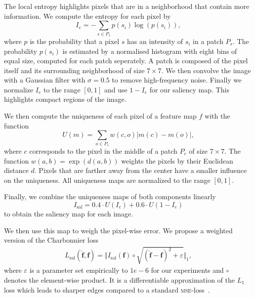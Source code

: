\documentclass{scrartcl}
\newcommand{\img}{\bm{f}} %
\begin{document}
The local entropy highlights pixels that are in a neighborhood that contain more information.
We compute the entropy for each pixel by
\begin{equation}
  \label{eq:entr}
  I_e = - \sum_{s \in P_s} p(s_i) \log(p(s_i)),
\end{equation}
where \(p\) is the probability that a pixel \(s\) has an intensity of \(s_i\) in a patch \(P_s\).
The probability $p(s_i)$ is estimated by a normalised histogram with eight bins of equal size, computed for each patch seperately.
A patch is composed of the pixel itself and its surrounding neighborhood of size \(7 \times 7\).
We then convolve the image with a Gaussian filter with \(\sigma = 0.5\) to remove high-frequency noise.
Finally we normalize $I_e$ to the range \([0, 1]\) and use $1 - I_e$ for our saliency map.
This highlights compact regions of the image.

We then compute the uniqueness of each pixel of a feature map \(f\) with the function
\begin{equation}
  \label{eq:uniq}
  U(m) = \sum_{o \in P_c} w(c, o) \vert m(c) - m(o) \vert,
\end{equation}
where \(c\) corresponds to the pixel in the middle of a patch \(P_c\) of size \(7 \times 7\).
The function \(w(a,b) = \exp(d(a, b))\) weights the pixels by their Euclidean distance \(d\).
Pixels that are farther away from the center have a smaller influence on the uniqueness.
All uniqueness maps are normalized to the range \([0,1]\).

Finally, we combine the uniqueness maps of both components linearly
\begin{equation}
  \label{eq:saliency}
  I_{\text{sal}} = 0.4 \cdot U(I_c) + 0.6 \cdot U(1 - I_e)
\end{equation}
to obtain the saliency map for each image.

We then use this map to weigh the pixel-wise error.
We propose a weighted version of the Charbonnier loss
\begin{align}
\label{eq:charbonnier}
  L_{\text{sal}}( \hat{\bm{\img}}, \bm{\img}) = \Vert I_{\text{sal}}(\img) \circ \sqrt{ (\hat{\img} - \img)^2 + \varepsilon} \Vert_1,
\end{align}
where $\varepsilon$ is a parameter set empirically to $1e-6$ for our experiments and \(\circ\) denotes the element-wise product.
It is a differentiable approximation of the $L_1$ loss which leads to sharper edges compared to a standard \textsc{mse}-loss~\cite{LapSRN}.
\end{document}
